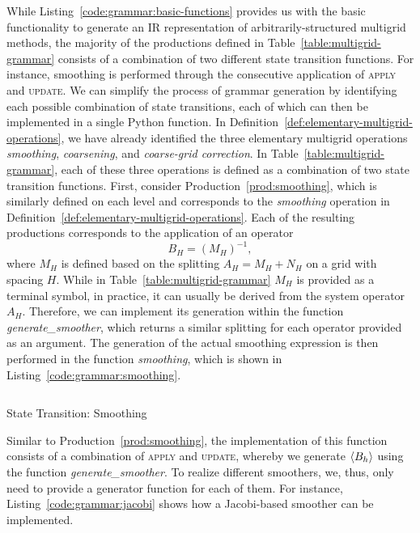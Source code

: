 While Listing~\ref{code:grammar:basic-functions} provides us with the basic functionality to generate an IR representation of arbitrarily-structured multigrid methods, the majority of the productions defined in Table~\ref{table:multigrid-grammar} consists of a combination of two different state transition functions.
For instance, smoothing is performed through the consecutive application of \textsc{apply} and \textsc{update}.
We can simplify the process of grammar generation by identifying each possible combination of state transitions, each of which can then be implemented in a single Python function.
In Definition~\ref{def:elementary-multigrid-operations}, we have already identified the three elementary multigrid operations \emph{smoothing}, \emph{coarsening}, and \emph{coarse-grid correction}.
In Table~\ref{table:multigrid-grammar}, each of these three operations is defined as a combination of two state transition functions.
First, consider Production~\eqref{prod:smoothing}, which is similarly defined on each level and corresponds to the \emph{smoothing} operation in Definition~\ref{def:elementary-multigrid-operations}.
Each of the resulting productions corresponds to the application of an operator
\begin{equation*}
	B_{H} = \left( M_{H} \right)^{-1},
\end{equation*}
where $M_{H}$ is defined based on the splitting $A_{H} = M_{H} + N_{H}$ on a grid with spacing $H$.
While in Table~\ref{table:multigrid-grammar} $M_{H}$ is provided as a terminal symbol, in practice, it can usually be derived from the system operator $A_{H}$.
Therefore, we can implement its generation within the function \emph{generate\_smoother}, which returns a similar splitting for each operator provided as an argument.
The generation of the actual smoothing expression is then performed in the function \emph{smoothing}, which is shown in Listing~\ref{code:grammar:smoothing}.
\begin{listing}
	\inputminted{python}{evostencils/grammar/smoothing.py}
	\caption{State Transition: Smoothing}
	\label{code:grammar:smoothing}
\end{listing}
Similar to Production~\eqref{prod:smoothing}, the implementation of this function consists of a combination of \textsc{apply} and \textsc{update}, whereby we generate $\langle B_{h} \rangle$ using the function \emph{generate\_smoother}.
To realize different smoothers, we, thus, only need to provide a generator function for each of them.
For instance, Listing~\ref{code:grammar:jacobi} shows how a Jacobi-based smoother can be implemented.
